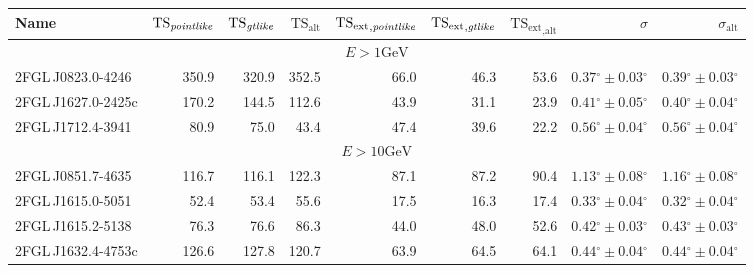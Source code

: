 \documentclass[12pt,preprint]{aastex}
\newcommand{\gev}{\text{GeV}\xspace}
\newcommand{\tsext}{{\ensuremath{\text{TS}_\text{ext}}}\xspace}
\newcommand{\tsextpointlike}{\ensuremath{\tsext_{,\pointlike}}\xspace}
\newcommand{\tsextgtlike}{\ensuremath{\tsext_{,\gtlike}}\xspace}
\newcommand{\tsextalt}{\ensuremath{\tsext_{,\alt}}\xspace}
\newcommand{\ts}{\text{TS}\xspace}
\newcommand{\alt}{\text{alt}\xspace}
\renewcommand{\deg}{\ensuremath{^\circ}\xspace}
\newcommand{\pointlike}{\text{\em pointlike}\xspace}
\newcommand{\gtlike}{\text{\em gtlike}\xspace}
\begin{document}
  \clearpage
  \begin{table}
    \begin{centering}
      \begin{tabular}{l|rrrrrrrr}
        \hline
        \hline
        Name                 &     $\ts_\pointlike$ &        $\ts_\gtlike$ &           $\ts_\alt$ &          \tsextpointlike &           \tsextgtlike &            \tsextalt &                    $\sigma$ &               $\sigma_\alt$ \\
        \hline
        \multicolumn{9}{c}{$E > 1 \gev$} \\
        \hline
        2FGL\,J0823.0-4246   &                350.9 &                320.9 &                352.5 &                     66.0 &                   46.3 &                 53.6 & $  0.37\deg \pm   0.03\deg$ & $  0.39\deg \pm   0.03\deg$ \\
        2FGL\,J1627.0-2425c  &                170.2 &                144.5 &                112.6 &                     43.9 &                   31.1 &                 23.9 & $  0.41\deg \pm   0.05\deg$ & $  0.40\deg \pm   0.04\deg$ \\
        2FGL\,J1712.4-3941   &                 80.9 &                 75.0 &                 43.4 &                     47.4 &                   39.6 &                 22.2 & $  0.56\deg \pm   0.04\deg$ & $  0.56\deg \pm   0.04\deg$ \\
        \hline
        \multicolumn{9}{c}{$E > 10 \gev$} \\
        \hline
        2FGL\,J0851.7-4635   &                116.7 &                116.1 &                122.3 &                     87.1 &                   87.2 &                 90.4 & $  1.13\deg \pm   0.08\deg$ & $  1.16\deg \pm   0.08\deg$ \\
        2FGL\,J1615.0-5051   &                 52.4 &                 53.4 &                 55.6 &                     17.5 &                   16.3 &                 17.4 & $  0.33\deg \pm   0.04\deg$ & $  0.32\deg \pm   0.04\deg$ \\
        2FGL\,J1615.2-5138   &                 76.3 &                 76.6 &                 86.3 &                     44.0 &                   48.0 &                 52.6 & $  0.42\deg \pm   0.03\deg$ & $  0.43\deg \pm   0.03\deg$ \\
        2FGL\,J1632.4-4753c  &                126.6 &                127.8 &                120.7 &                     63.9 &                   64.5 &                 64.1 & $  0.44\deg \pm   0.04\deg$ & $  0.44\deg \pm   0.04\deg$ \\

\end{tabular}
\end{centering}
\end{table}
\end{document}
